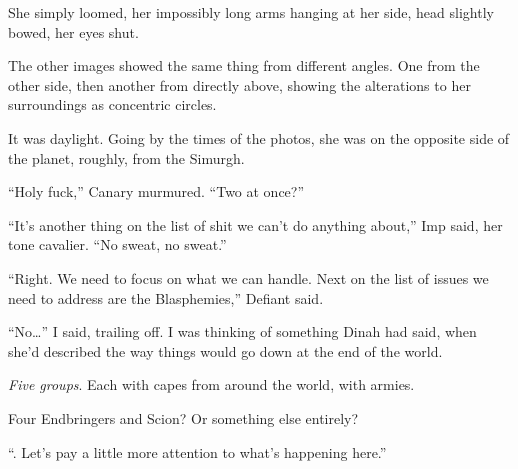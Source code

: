 She simply loomed, her impossibly long arms hanging at her side, head slightly bowed, her eyes shut.



The other images showed the same thing from different angles.  One from the other side, then another from directly above, showing the alterations to her surroundings as concentric circles.



It was daylight.  Going by the times of the photos, she was on the opposite side of the planet, roughly, from the Simurgh.



``Holy fuck,'' Canary murmured.  ``Two at once?''



``It's another thing on the list of shit we can't do anything about,'' Imp said, her tone cavalier.  ``No sweat, no sweat.''



``Right.  We need to focus on what we can handle.  Next on the list of issues we need to address are the Blasphemies,'' Defiant said.



``No\ldots'' I said, trailing off.  I was thinking of something Dinah had said, when she'd described the way things would go down at the end of the world.



\emph{Five groups}.  Each with capes from around the world, with armies.



Four Endbringers and Scion?  Or something else entirely?



``\ldotsNo.  Let's pay a little more attention to what's happening here.''





